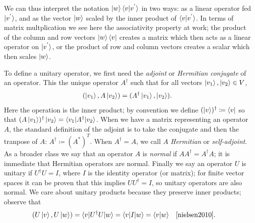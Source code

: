 \documentclass[12pt,twoside]{reedthesis}
\theoremstyle{plain}   %
\theoremstyle{definition}
\theoremstyle{remark}
\numberwithin{equation}{section}
\begin{document}
   We can thus interpret the notation $\ket{w} \braket{v|v^{'}}$ in two ways: as a linear operator fed $\ket{v^{'}}$, and as the vector $\ket{w}$ scaled by the inner product of $\braket{v|v^{'}}$.
   In terms of matrix multplication we see here the associativity property at work; the product of the column and row vectors $\ket{w} \bra{v}$ creates a matrix which then acts as a linear operator on
   $\ket{v^{'}}$, or the product of row and column vectors creates a scalar which then scales $\ket{w}$.
   \par
   To define a unitary operator, we first need the \emph{adjoint} or \emph{Hermitian conjugate} \cite[2.1.6]{nielsen2010} of an operator.
   This the unique operator $A^\dag$ such that for all vectors $\ket{v_1}, \ket{v_2} \in V$,
   \[(\ket{v_1}, A \ket{v_2}) = ( A^\dag \ket{v_1}, \ket{v_2} ).\]
   Here the operation is the inner product; by convention we define $(\ket{v})^\dag \coloneq \bra{v}$ so that $(A \ket{v_1})^\dag \ket{v_2} = \braket{v_1 | A^\dag |v_2 }$.
   When we have a matrix representing an operator $A$, the standard definition of the adjoint is to take the conjugate and then the tranpose of $A$: $A^\dag \coloneq (A^*)^T$.
   When $A^\dag = A$, we call $A$ \emph{Hermitian} or \emph{self-adjoint}.
   As a broader class we say that an operator $A$ is \emph{normal} if $AA^\dag = A^\dag A$; it is immediate that Hermitian operators are normal.
   Finally we say an operator $U$ is unitary if $U^\dag U = I$, where $I$ is the identity operator (or matrix); for finite vector spaces it can be proven that this implies $ U U^\dag = I$, so unitary
   operators are also normal.
   We care about unitary products because they preserve inner products; observe that
   \begin{align*}
     & (U \ket{v}, U \ket{w}) = \braket{v | U^\dag U  | w} = \braket{v | I | w} = \braket{v | w}  & & \text{\cite[2.36]{nielsen2010}.}
   \end{align*}
   
\end{document}
